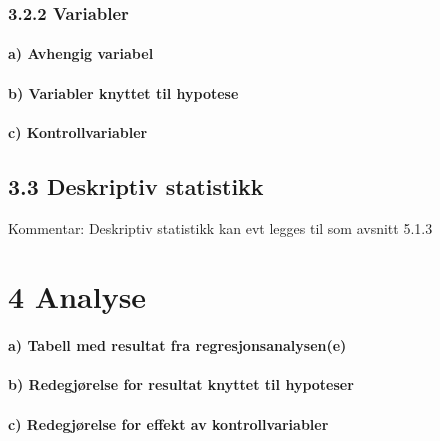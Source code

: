 \documentclass[
  12pt,
  a4paper,
  DIV=11,
  numbers=noendperiod]{scrartcl}
\let\oldparagraph\paragraph
\renewcommand{\paragraph}[1]{\oldparagraph{#1}\mbox{}}
\begin{document}
\subsubsection{3.2.2 Variabler}\label{variabler}

\paragraph{a) Avhengig variabel}\label{a-avhengig-variabel}

\paragraph{b) Variabler knyttet til
hypotese}\label{b-variabler-knyttet-til-hypotese}

\paragraph{c) Kontrollvariabler}\label{c-kontrollvariabler}

\subsection{3.3 Deskriptiv statistikk}\label{deskriptiv-statistikk}

Kommentar: Deskriptiv statistikk kan evt legges til som avsnitt 5.1.3

\newpage

\section{4 Analyse}\label{analyse}

\paragraph{a) Tabell med resultat fra
regresjonsanalysen(e)}\label{a-tabell-med-resultat-fra-regresjonsanalysene}

\paragraph{b) Redegjørelse for resultat knyttet til
hypoteser}\label{b-redegjuxf8relse-for-resultat-knyttet-til-hypoteser}

\paragraph{c) Redegjørelse for effekt av
kontrollvariabler}\label{c-redegjuxf8relse-for-effekt-av-kontrollvariabler}
\end{document}
